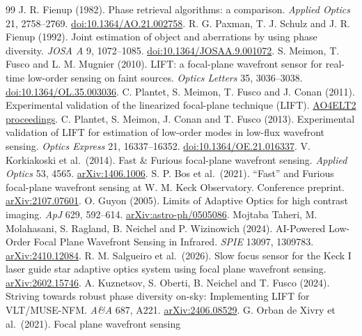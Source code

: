 \documentclass[11pt,a4paper]{article}
\begin{document}
\begin{thebibliography}{99}\small
{} J. R. Fienup (1982). Phase retrieval algorithms: a comparison.
\emph{Applied Optics} 21, 2758--2769. \href{https://doi.org/10.1364/AO.21.002758}{doi:10.1364/AO.21.002758}.
 R. G. Paxman, T. J. Schulz and J. R. Fienup (1992). Joint estimation
of object and aberrations by using phase diversity. \emph{JOSA A} 9, 1072--1085.
\href{https://doi.org/10.1364/JOSAA.9.001072}{doi:10.1364/JOSAA.9.001072}.
 S. Meimon, T. Fusco and L. M. Mugnier (2010). LIFT: a focal-plane
wavefront sensor for real-time low-order sensing on faint sources.
\emph{Optics Letters} 35, 3036--3038. \href{https://doi.org/10.1364/OL.35.003036}{doi:10.1364/OL.35.003036}.
 C. Plantet, S. Meimon, T. Fusco and J. Conan (2011).
Experimental validation of the linearized focal-plane technique (LIFT).
\href{https://ao4elt2.lesia.obspm.fr/sites/ao4elt2/IMG/pdf/113meimon.pdf}{AO4ELT2 proceedings}.
 C. Plantet, S. Meimon, J. Conan and T. Fusco (2013).
Experimental validation of LIFT for estimation of low-order modes in low-flux
wavefront sensing. \emph{Optics Express} 21, 16337--16352.
\href{https://doi.org/10.1364/OE.21.016337}{doi:10.1364/OE.21.016337}.
 V. Korkiakoski et al.\ (2014). Fast \& Furious focal-plane
wavefront sensing. \emph{Applied Optics} 53, 4565.
\href{https://arxiv.org/abs/1406.1006}{arXiv:1406.1006}.
 S. P. Bos et al.\ (2021). ``Fast'' and Furious focal-plane wavefront
sensing at W. M. Keck Observatory. Conference preprint.
\href{https://arxiv.org/abs/2107.07601}{arXiv:2107.07601}.
 O. Guyon (2005). Limits of Adaptive Optics for high contrast imaging.
\emph{ApJ} 629, 592--614. \href{https://arxiv.org/abs/astro-ph/0505086}{arXiv:astro-ph/0505086}.
 Mojtaba Taheri, M. Molahasani, S. Ragland, B. Neichel and
P. Wizinowich (2024). AI-Powered Low-Order Focal Plane Wavefront Sensing in
Infrared. \emph{SPIE} 13097, 1309783.
\href{https://arxiv.org/html/2410.12084v1}{arXiv:2410.12084}.
 R. M. Salgueiro et al.\ (2026). Slow focus sensor for the Keck I
laser guide star adaptive optics system using focal plane wavefront sensing.
\href{https://arxiv.org/html/2602.15746v1}{arXiv:2602.15746}.
 A. Kuznetsov, S. Oberti, B. Neichel and T. Fusco (2024).
Striving towards robust phase diversity on-sky: Implementing LIFT for
VLT/MUSE-NFM. \emph{A\&A} 687, A221.
\href{https://arxiv.org/abs/2406.08529}{arXiv:2406.08529}.
 G. Orban de Xivry et al.\ (2021). Focal plane wavefront sensing

\end{thebibliography}
\end{document}
